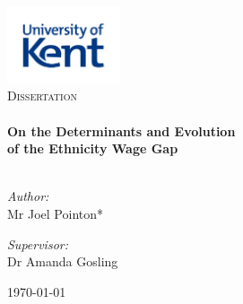 \begin{titlepage}
\vbox{ }

\vbox{ }

\begin{center}
\includegraphics[width=0.25\textwidth]{./images/kent_logo.jpg}\\[1cm]
\textsc{\LARGE Dissertation}\\[1.5cm]

\vbox{ }
\HRule \\[0.4cm]
{ \huge \bfseries \linespread{1} On the Determinants and Evolution}\\[0.4cm]
{ \huge \bfseries \linespread{1} of the Ethnicity Wage Gap \vspace{-10pt}}\\[0.4cm]
\HRule \\[1.5cm]
\begin{minipage}{0.4\textwidth}
\begin{flushleft} \large
\emph{Author:}\\
Mr Joel Pointon*
\end{flushleft}
\end{minipage}
\begin{minipage}{0.4\textwidth}
\begin{flushright} \large
\emph{Supervisor:} \\
Dr Amanda Gosling
\end{flushright}
\end{minipage}
\vfill
{\large \today {}}

\end{center}
\end{titlepage}